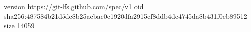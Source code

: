 version https://git-lfs.github.com/spec/v1
oid sha256:487584b21d5dc8b25acbac0c1920dfa2915cf8ddb4dc4745da8b431f0eb89512
size 14059
